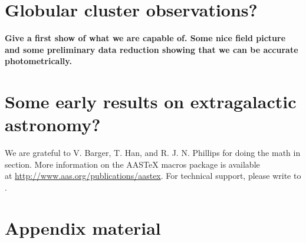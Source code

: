 \documentclass[12pt,preprint]{aastex}
\begin{document}
\section{Globular cluster observations?}
{\bf \color{red} Give a first show of what we are capable of. Some nice field picture and some preliminary data reduction showing that we can be accurate photometrically.}

\section{Some early results on extragalactic astronomy?}

\acknowledgments

We are grateful to V. Barger, T. Han, and R. J. N. Phillips for
doing the math in section.
More information on the AASTeX macros package is available \\ at
\url{http://www.aas.org/publications/aastex}.
For technical support, please write to
.


\appendix

\section{Appendix material}




\clearpage
\end{document}
